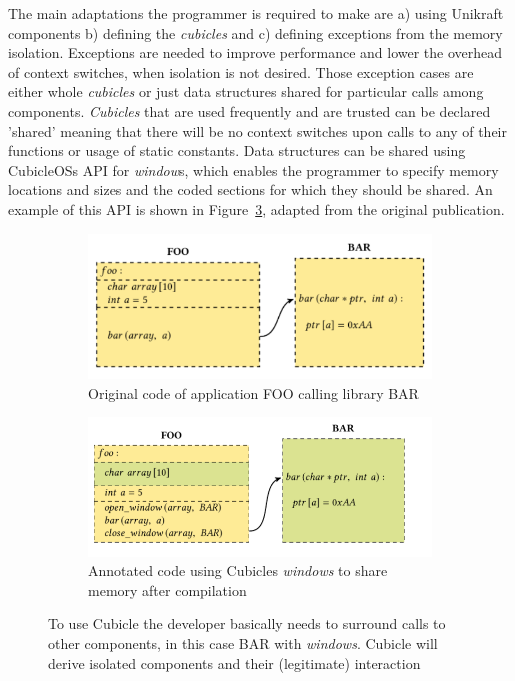 The main adaptations the programmer is required to make are a) using Unikraft components b) defining the \emph{cubicles} and c) defining exceptions from the memory isolation. Exceptions are needed to improve performance and lower the overhead of context switches, when isolation is not desired. Those exception cases are either whole \emph{cubicles} or just data structures shared for particular calls among components. \emph{Cubicles} that are used frequently and are trusted can be declared 'shared' meaning  that there will be no context switches upon calls to any of their functions or usage of static constants. Data structures can be shared using CubicleOSs API for \emph{window}s, which enables the programmer to specify memory locations and sizes and the coded sections for which they should be shared. An example of this API is shown in Figure~\ref{fig:CubicleAPI}, adapted from the original publication.

\begin{figure}[H]
    \begin{subfigure}[b]{0.45\textwidth}
         \includegraphics[width=\textwidth]{figures/cubicle_example_original.png}
         \caption{Original code of application FOO calling library BAR}
         \label{cubicleOriginal}
     \end{subfigure}
     \hfill
     \begin{subfigure}[b]{0.45\textwidth}
         \includegraphics[width=\textwidth]{figures/cubicle_example_windows.png}
         \caption{Annotated code using Cubicles \textit{windows} to share memory after compilation}
         \label{cubicleWindow}
     \end{subfigure}
    \caption{To use Cubicle the developer basically needs to surround calls to other components, in this case BAR with \textit{windows}. Cubicle will derive isolated components and their (legitimate) interaction}
    \label{fig:CubicleAPI}
    \end{figure}

